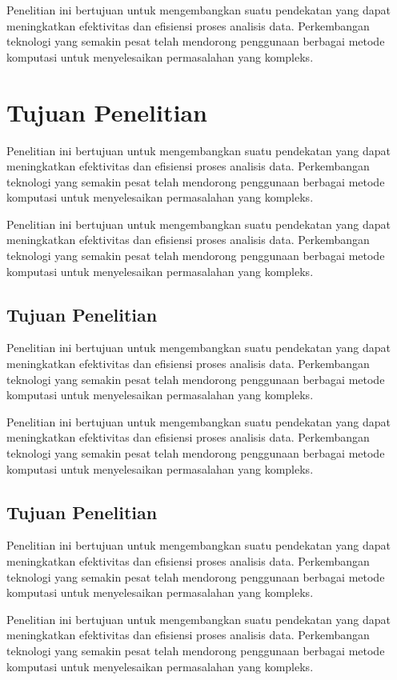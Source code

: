 Penelitian ini bertujuan untuk mengembangkan suatu pendekatan yang dapat meningkatkan efektivitas dan efisiensi proses analisis data. Perkembangan teknologi yang semakin pesat telah mendorong penggunaan berbagai metode komputasi untuk menyelesaikan permasalahan yang kompleks.

\section{Tujuan Penelitian}
Penelitian ini bertujuan untuk mengembangkan suatu pendekatan yang dapat meningkatkan efektivitas dan efisiensi proses analisis data. Perkembangan teknologi yang semakin pesat telah mendorong penggunaan berbagai metode komputasi untuk menyelesaikan permasalahan yang kompleks.

Penelitian ini bertujuan untuk mengembangkan suatu pendekatan yang dapat meningkatkan efektivitas dan efisiensi proses analisis data. Perkembangan teknologi yang semakin pesat telah mendorong penggunaan berbagai metode komputasi untuk menyelesaikan permasalahan yang kompleks.

\subsection{Tujuan Penelitian}
Penelitian ini bertujuan untuk mengembangkan suatu pendekatan yang dapat meningkatkan efektivitas dan efisiensi proses analisis data. Perkembangan teknologi yang semakin pesat telah mendorong penggunaan berbagai metode komputasi untuk menyelesaikan permasalahan yang kompleks.

Penelitian ini bertujuan untuk mengembangkan suatu pendekatan yang dapat meningkatkan efektivitas dan efisiensi proses analisis data. Perkembangan teknologi yang semakin pesat telah mendorong penggunaan berbagai metode komputasi untuk menyelesaikan permasalahan yang kompleks.

\subsection{Tujuan Penelitian}
Penelitian ini bertujuan untuk mengembangkan suatu pendekatan yang dapat meningkatkan efektivitas dan efisiensi proses analisis data. Perkembangan teknologi yang semakin pesat telah mendorong penggunaan berbagai metode komputasi untuk menyelesaikan permasalahan yang kompleks.

Penelitian ini bertujuan untuk mengembangkan suatu pendekatan yang dapat meningkatkan efektivitas dan efisiensi proses analisis data. Perkembangan teknologi yang semakin pesat telah mendorong penggunaan berbagai metode komputasi untuk menyelesaikan permasalahan yang kompleks.

